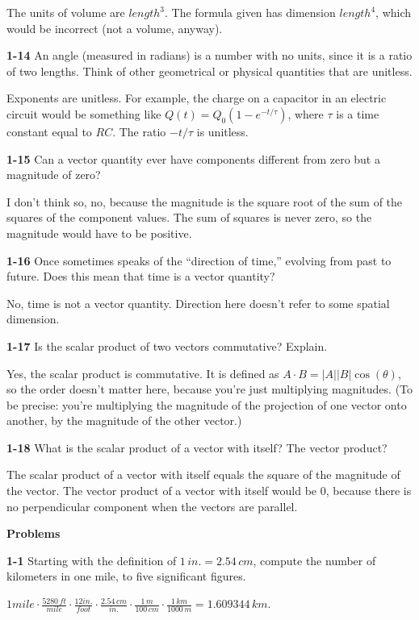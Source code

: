 \documentclass{amsart}
\begin{document}
The units of volume are $length^{3}$.  The formula given has dimension $length^{4}$,
which would be incorrect (not a volume, anyway).

\textbf{1-14} An angle (measured in radians) is a number with no units, since it is a ratio of two lengths.
Think of other geometrical or physical quantities that are unitless.

Exponents are unitless.  For example, the charge on a capacitor in an electric circuit
would be something like $Q(t) = Q_{0} (1-e^{-t/\tau})$, where $\tau$ is a time constant equal to $RC$.
The ratio $-t/\tau$ is unitless.

\textbf{1-15} Can a vector quantity ever have components different from zero but a magnitude of zero?

I don't think so, no, because the magnitude is the square root of the sum of the squares of the component values.
The sum of squares is never zero, so the magnitude would have to be positive.

\textbf{1-16} Once sometimes speaks of the ``direction of time,'' evolving from past to future.
Does this mean that time is a vector quantity?

No, time is not a vector quantity.  Direction here doesn't refer to some spatial dimension.

\textbf{1-17} Is the scalar product of two vectors commutative?  Explain.

Yes, the scalar product is commutative.
It is defined as $A \cdot B = \lvert A \rvert \lvert B \rvert \cos(\theta)$, so the order doesn't matter here,
because you're just multiplying magnitudes.
(To be precise: you're multiplying the magnitude of the projection of one vector onto another,
by the magnitude of the other vector.)

\textbf{1-18} What is the scalar product of a vector with itself?  The vector product?

The scalar product of a vector with itself equals the square of the magnitude of the vector.
The vector product of a vector with itself would be 0, because there is no perpendicular component when the vectors are parallel.


\textbf{Problems}

\textbf{1-1} Starting with the definition of $1 \, in. = 2.54 \, cm$,
compute the number of kilometers in one mile, to five significant figures.

$1 mile \cdot \frac{5280 \, ft}{mile} \cdot \frac{12 in.}{foot} \cdot \frac{2.54 \, cm}{in.} \cdot
\frac{1 \, m}{100 \, cm} \cdot \frac{1 \, km}{1000 \, m} = 1.609344 \, km$.
\end{document}
